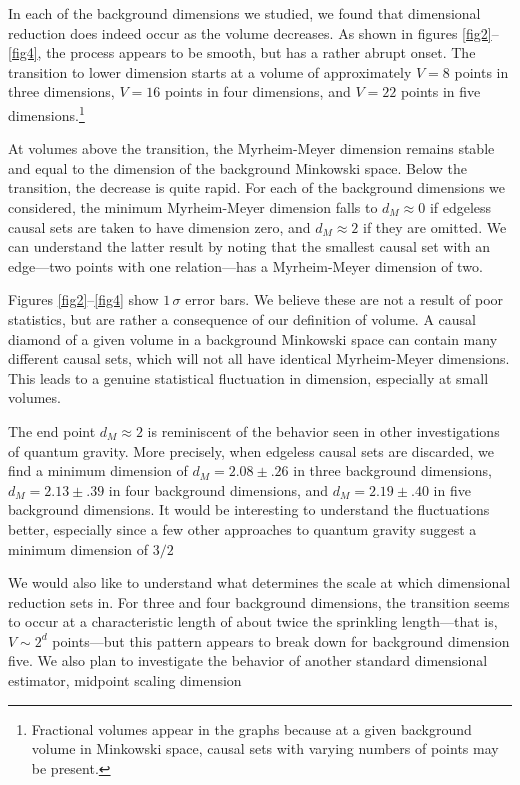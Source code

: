 \documentclass[12pt]{article}
\makeatletter
\def\section{\@startsection{section}{1}{\z@}{3.5ex plus 1ex minus
   .2ex}{2.3ex plus .2ex}{\large\bf}}
\makeatother
\begin{document}
\section{Results}

In each of the background dimensions we studied, we found that dimensional reduction
does indeed occur as the volume decreases.   As shown in figures \ref{fig2}--\ref{fig4},
the process appears to be smooth, but has a rather abrupt onset.  The
transition to lower dimension starts at a volume of approximately $V=8$ points in
three dimensions, $V=16$ points in four dimensions, and $V=22$ points in five
dimensions.\footnote{Fractional volumes appear in the graphs because at a given
background volume in Minkowski space, causal sets with varying numbers of points
may be present.}

At volumes above the transition, the Myrheim-Meyer dimension remains stable and
equal to the dimension of the background Minkowski space.  Below the transition,
the decrease is quite rapid.  For each of the background dimensions we considered,
the minimum Myrheim-Meyer dimension falls to $d_M\approx 0$ if edgeless causal
sets are taken to have dimension zero, and $d_M\approx 2$ if they are omitted.
We can understand the latter result by noting that the smallest causal set with an
edge---two points with one relation---has a Myrheim-Meyer dimension of two.

Figures \ref{fig2}--\ref{fig4} show $1\, \sigma$ error bars.  We believe these are not
a result of poor statistics, but are rather a consequence of our definition of
volume.  A causal diamond of a given volume in a background Minkowski space can
contain many different causal sets, which will not all have identical Myrheim-Meyer
dimensions.  This leads to a genuine statistical fluctuation in dimension, especially
at small volumes.

The end point $d_M\approx 2$ is reminiscent of the behavior seen in other
investigations of quantum gravity.  More precisely, when edgeless causal
sets are discarded, we find a minimum dimension of $d_M = 2.08 \pm .26$ in three
background dimensions, $d_M = 2.13 \pm .39$ in four background dimensions, and
$d_M = 2.19 \pm .40$ in five background  dimensions.  It would be interesting to
understand the fluctuations better, especially since a few other approaches to
quantum gravity suggest a minimum dimension of $3/2$

We would also like to understand what determines the scale at which dimensional
reduction sets in.  For three and four background dimensions, the transition seems to
occur at a characteristic length of about twice the sprinkling length---that is,
$V\sim 2^d$ points---but this pattern appears to break down for background
 dimension five.  We also plan to investigate the behavior of another standard
dimensional estimator, midpoint scaling dimension 
\end{document}
